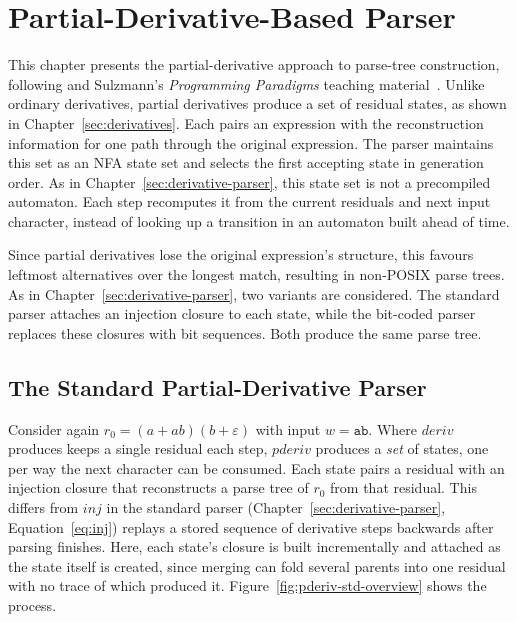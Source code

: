 
\chapter{Partial-Derivative-Based Parser}
\label{sec:partial-derivative-parser}

This chapter presents the partial-derivative approach to parse-tree construction, 
following \citep[\S5, Figs.~10--11, pp.~85--86]{sulzmannlu2012}
and Sulzmann's \emph{Programming Paradigms} teaching material~\citep[p.8]{sulzmann_slides}.
Unlike ordinary derivatives, partial derivatives produce a set of residual states,
as shown in Chapter~\ref{sec:derivatives}.
Each pairs an expression with the reconstruction information 
for one path through the original expression.
The parser maintains this set as an NFA state set
and selects the first accepting state in generation order.
As in Chapter~\ref{sec:derivative-parser}, this state set is not a
precompiled automaton. 
Each step recomputes it from the current
residuals and next input character, instead of looking up a
transition in an automaton built ahead of time.

Since partial derivatives lose the original expression's structure,
this favours leftmost alternatives over the longest match, 
resulting in non-POSIX parse trees.
As in Chapter~\ref{sec:derivative-parser}, two variants are considered. 
The standard parser attaches an injection closure to each state, 
while the bit-coded parser replaces these closures with bit sequences. 
Both produce the same parse tree.

%
%
%
%
%

\section{The Standard Partial-Derivative Parser}
\label{sec:pderiv-std}

Consider again $r_0 = (a + ab)(b + \varepsilon)$ with input $w = \mathtt{ab}$. 
Where $\mathit{deriv}$ produces keeps a single residual each step, 
$\mathit{pderiv}$ produces a \emph{set} of states, 
one per way the next character can be consumed.
Each state pairs a residual with an injection closure
that reconstructs a parse tree of $r_0$ from that residual.
This differs from $\mathit{inj}$ in the standard parser
(Chapter~\ref{sec:derivative-parser}, 
Equation~\eqref{eq:inj}) replays a stored sequence of 
derivative steps backwards after parsing finishes. 
Here, each state's closure is built incrementally and attached
as the state itself is created, since merging can fold several
parents into one residual with no trace of which produced it.
Figure~\ref{fig:pderiv-std-overview} shows the process.

